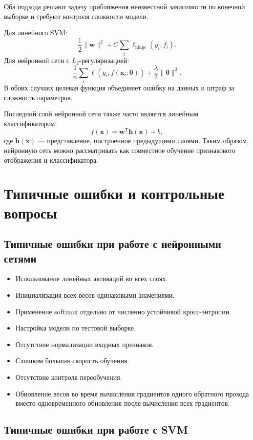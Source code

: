 \documentclass[12pt,a4paper]{article}
\theoremstyle{definition}
\newcommand{\T}{\mathsf{T}}
\newcommand{\1}{\mathbf{1}}
\begin{document}
Оба подхода решают задачу приближения неизвестной зависимости
по конечной выборке и требуют контроля сложности модели.

Для линейного SVM:
\[
    \frac{1}{2}\|\bm{w}\|^2
    +
    C\sum_i\ell_{\mathrm{hinge}}(y_i,f_i).
\]
Для нейронной сети с $L_2$-регуляризацией:
\[
    \frac{1}{n}\sum_i
    \ell(y_i,f(\bm{x}_i;\bm{\theta}))
    +
    \frac{\lambda}{2}\|\bm{\theta}\|^2.
\]
В обоих случаях целевая функция объединяет ошибку на данных и штраф
за сложность параметров.

Последний слой нейронной сети также часто является линейным
классификатором:
\[
    f(\bm{x})
    =
    \bm{w}^{\T}\bm{h}(\bm{x})+b,
\]
где $\bm{h}(\bm{x})$ --- представление, построенное предыдущими слоями.
Таким образом, нейронную сеть можно рассматривать как совместное
обучение признакового отображения и классификатора.

\section{Типичные ошибки и контрольные вопросы}

\subsection{Типичные ошибки при работе с нейронными сетями}

\begin{itemize}
    \item Использование линейных активаций во всех слоях.
    \item Инициализация всех весов одинаковыми значениями.
    \item Применение softmax отдельно от численно устойчивой
    кросс-энтропии.
    \item Настройка модели по тестовой выборке.
    \item Отсутствие нормализации входных признаков.
    \item Слишком большая скорость обучения.
    \item Отсутствие контроля переобучения.
    \item Обновление весов во время вычисления градиентов одного
    обратного прохода вместо одновременного обновления после
    вычисления всех градиентов.
\end{itemize}

\subsection{Типичные ошибки при работе с SVM}
\end{document}
